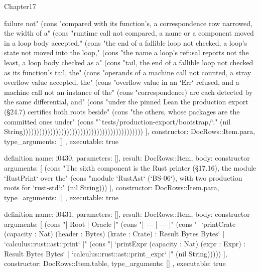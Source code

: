 \begin{lexlean}{Chapter17}
\begin{semanticmodule}
{{failure not" (cons "compared with its function's, a correspondence row narrowed, the width of a" (cons "runtime call not compared, a name or a component moved in a loop body accepted," (cons "the end of a fallible loop not checked, a loop's state not moved into the loop," (cons "the name a loop's refusal reports not the least, a loop body checked as a" (cons "tail, the end of a fallible loop not checked as its function's tail, the" (cons "operands of a machine call not counted, a stray overflow value accepted, the" (cons "overflow value in an `Err` refused, and a machine call not an instance of the" (cons "correspondence) are each detected by the same differential, and" (cons "under the pinned Lean the production export (§24.7) certifies both roots beside" (cons "the others, whose packages are the committed ones under" (cons "`tests/production-export/bootstrap/`." (nil String))))))))))))))))))))))))))))))))))))))))))))
    ],
    constructor: DocRows::Item.para,
    type_arguments: []
  },
  executable: true
}

definition{
  name: i0430,
  parameters: [],
  result: DocRows::Item,
  body: constructor{
    arguments: [
      (cons "The sixth component is the Rust printer (§17.16), the module `RustPrint` over the" (cons "module `RustAst` (`BS-06`), with two production roots for `rust-std`:" (nil String)))
    ],
    constructor: DocRows::Item.para,
    type_arguments: []
  },
  executable: true
}

definition{
  name: i0431,
  parameters: [],
  result: DocRows::Item,
  body: constructor{
    arguments: [
      (cons "| Root | Oracle |" (cons "| --- | --- |" (cons "| `printCrate (capacity : Nat) (header : Bytes) (krate : Crate) : Result Bytes Bytes` | `calculus::rust::ast::print` |" (cons "| `printExpr (capacity : Nat) (expr : Expr) : Result Bytes Bytes` | `calculus::rust::ast::print_expr` |" (nil String)))))
    ],
    constructor: DocRows::Item.table,
    type_arguments: []
  },
  executable: true
}


\end{semanticmodule}
\end{lexlean}
